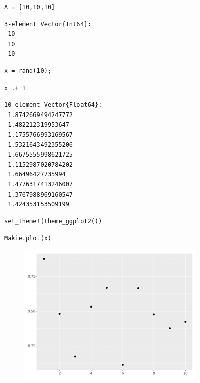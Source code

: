 \begin{lstlisting}[language=JuliaLocal, style=julia]
A = [10,10,10]
\end{lstlisting}

\begin{verbatim}
3-element Vector{Int64}:
 10
 10
 10
\end{verbatim}

\begin{lstlisting}[language=JuliaLocal, style=julia]
x = rand(10);
\end{lstlisting}

\begin{lstlisting}[language=JuliaLocal, style=julia]
x .+ 1
\end{lstlisting}

\begin{verbatim}
10-element Vector{Float64}:
 1.8742669494247772
 1.482212319953647
 1.1755766993169567
 1.5321643492355206
 1.6675555998621725
 1.1152987020784202
 1.66496427735994
 1.4776317413246007
 1.3767988969160547
 1.424353153509199
\end{verbatim}

\begin{lstlisting}[language=JuliaLocal, style=julia]
set_theme!(theme_ggplot2())
\end{lstlisting}

\begin{lstlisting}[language=JuliaLocal, style=julia]
Makie.plot(x)
\end{lstlisting}

\begin{figure}[H]
	\centering
	\includegraphics[width=0.8\textwidth]{./figures/examplepluto_figure2.pdf}
	\label{fig:examplepluto_figure2.pdf}

\end{figure}

